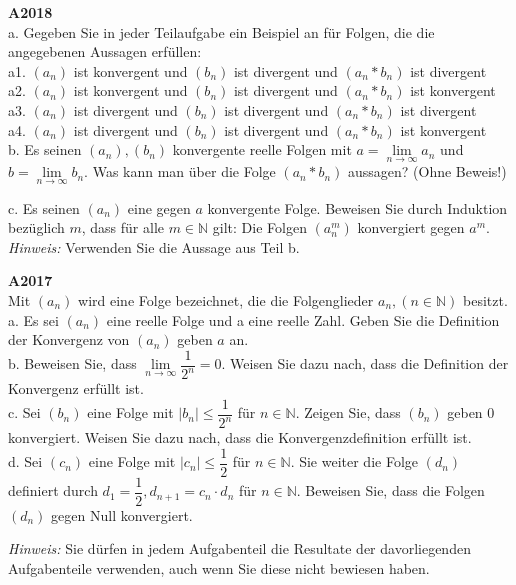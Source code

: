 \documentclass[landscape,twocolumn,a4paper]{article}
\begin{document}
\textbf{A2018} \\
a. Gegeben Sie in jeder Teilaufgabe ein Beispiel an für Folgen, die die angegebenen Aussagen erfüllen: \\
a1. $(a_n)$ ist konvergent und $(b_n)$ ist divergent und $(a_n * b_n)$ ist divergent \\
a2. $(a_n)$ ist konvergent und $(b_n)$ ist divergent und $(a_n * b_n)$ ist konvergent \\
a3. $(a_n)$ ist divergent und $(b_n)$ ist divergent und $(a_n * b_n)$ ist divergent \\
a4. $(a_n)$ ist divergent und $(b_n)$ ist divergent und $(a_n * b_n)$ ist konvergent \\

b. Es seinen $(a_n),(b_n)$ konvergente reelle Folgen mit $a = \lim \limits_{n \to \infty} a_n$ und
$b = \lim \limits_{n \to \infty} b_n$. Was kann man über die Folge $(a_n * b_n)$ aussagen? (Ohne Beweis!) 

c. Es seinen $(a_n)$ eine gegen $a$ konvergente Folge. Beweisen Sie durch Induktion bezüglich $m$, dass für 
alle $m \in \mathbb{N}$ gilt: Die Folgen $(a_n^m)$ konvergiert gegen $a^m$. \textit{Hinweis:} Verwenden Sie die Aussage aus Teil b.
\bigskip 


\textbf{A2017} \\
Mit $(a_n)$ wird eine Folge bezeichnet, die die Folgenglieder $a_n, (n \in \mathbb{N})$ besitzt. \\
a. Es sei $(a_n)$ eine reelle Folge und a eine reelle Zahl. Geben Sie die Definition der Konvergenz von $(a_n)$ geben $a$ an. \\
b. Beweisen Sie, dass  $ \lim \limits_{n \to \infty} \dfrac{1}{2^n} = 0$. Weisen Sie dazu nach, dass die Definition der Konvergenz erfüllt ist. \\
c. Sei $(b_n)$ eine Folge mit $\left|b_n\right| \le \dfrac{1}{2^n}$ für $n \in \mathbb{N}$. Zeigen Sie,
dass $(b_n)$ geben $0$ konvergiert. Weisen Sie dazu nach, dass die Konvergenzdefinition erfüllt ist. \\
d. Sei $(c_n)$ eine Folge mit  $\left|c_n\right| \le \dfrac{1}{2}$ für $n \in \mathbb{N}$. Sie weiter die 
Folge $(d_n)$ definiert durch $d_1 = \dfrac{1}{2}, d_{n+1} = c_n \cdot d_n$ für $n \in \mathbb{N}$.
Beweisen Sie, dass die Folgen $(d_n)$ gegen Null konvergiert. 

\textit{Hinweis:} Sie dürfen in jedem Aufgabenteil die Resultate der davorliegenden Aufgabenteile verwenden, auch wenn Sie diese nicht bewiesen haben.
\bigskip 
\end{document}
